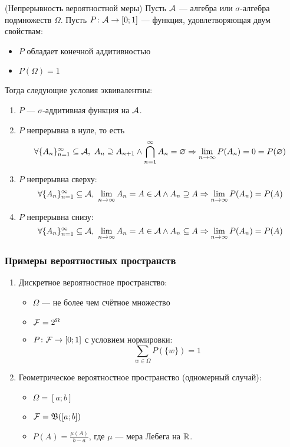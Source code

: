 \begin{theorem} (Непрерывность вероятностной меры)
	Пусть $\mathcal{A}$ --- алгебра или $\sigma$-алгебра подмножеств $\Omega$. Пусть $P \colon \mathcal{A} \to [0; 1]$ --- функция, удовлетворяющая двум свойствам:
	\begin{itemize}
		\item $P$ обладает конечной аддитивностью
		
		\item $P(\Omega) = 1$
	\end{itemize}
	Тогда следующие условия эквивалентны:
	\begin{enumerate}
		\item $P$ --- $\sigma$-аддитивная функция на $\mathcal{A}$.
		
		\item $P$ непрерывна в нуле, то есть
		\[
			\forall \{A_n\}_{n = 1}^\infty \subseteq \mathcal{A},\ A_n \supseteq A_{n + 1} \wedge \bigcap_{n = 1}^\infty A_n = \varnothing \Rightarrow \lim_{n \to \infty} P(A_n) = 0 = P(\varnothing)
		\]
		
		\item $P$ непрерывна сверху:
		\[
			\forall \{A_n\}_{n = 1}^\infty \subseteq \mathcal{A},\ \lim_{n \to \infty} A_n = A \in \mathcal{A} \wedge A_n \supseteq A \Rightarrow \lim_{n \to \infty} P(A_n) = P(A)
		\]
		
		\item $P$ непрерывна снизу:
		\[
			\forall \{A_n\}_{n = 1}^\infty \subseteq \mathcal{A},\ \lim_{n \to \infty} A_n = A \in \mathcal{A} \wedge A_n \subseteq A \Rightarrow \lim_{n \to \infty} P(A_n) = P(A)
		\]
	\end{enumerate}
\end{theorem}

\subsubsection*{Примеры вероятностных пространств}

\begin{enumerate}
	\item Дискретное вероятностное пространство:
	\begin{itemize}
		\item $\Omega$ --- не более чем счётное множество
		
		\item $\mathcal{F} = 2^\Omega$
		
		\item $P \colon \mathcal{F} \to [0; 1]$ с условием нормировки:
		\[
			\sum_{w \in \Omega} P(\{w\}) = 1
		\]
	\end{itemize}

	\item Геометрическое вероятностное пространство (одномерный случай):
	\begin{itemize}
		\item $\Omega = [a; b]$
		
		\item $\mathcal{F} = \mathfrak{B}([a; b])$
		
		\item $P(A) = \frac{\mu(A)}{b - a}$, где $\mu$ --- мера Лебега на $\mathbb{R}$.
	\end{itemize}
\end{enumerate}

